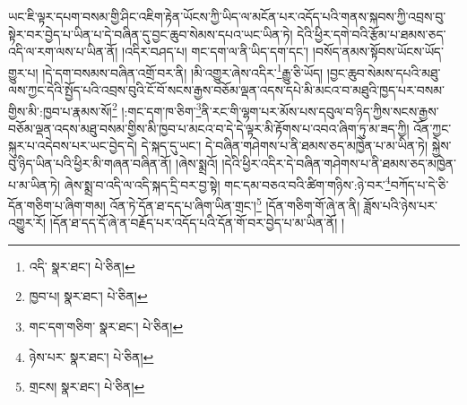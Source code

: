 ཡང་ཇི་ལྟར་དཔག་བསམ་གྱི་ཤིང་འཇིག་རྟེན་ཡོངས་ཀྱི་ཡིད་ལ་མངོན་པར་འདོད་པའི་གནས་སྐབས་ཀྱི་འབྲས་བུ་སྟེར་བར་བྱེད་པ་ཡིན་པ་དེ་བཞིན་དུ་བྱང་ཆུབ་སེམས་དཔའ་ཡང་ཡིན་ཏེ། དེའི་ཕྱིར་དགེ་བའི་རྩོམ་པ་ཐམས་ཅད་འདི་ལ་རག་ལས་པ་ཡིན་ནོ། །འདིར་བཤད་པ། གང་དག་ལ་ནི་ཡིད་དག་དང་། །བསོད་ནམས་སྟོབས་ཡོངས་ཡོད་གྱུར་པ། །དེ་དག་བསམས་བཞིན་འགྲོ་བར་ནི། །མི་འགྱུར་ཞེས་འདིར་\footnote{འདི་  སྣར་ཐང་།  པེ་ཅིན། }རྒྱུ་ཅི་ཡོད། །བྱང་ཆུབ་སེམས་དཔའི་མཐུ་ལས་ཀྱང་དེའི་སྤྱོད་པའི་འབྲས་བུའི་ངོ་བོ་སངས་རྒྱས་བཅོམ་ལྡན་འདས་དཔེ་མི་མངའ་བ་མཐུའི་ཁྱད་པར་བསམ་གྱིས་མི་:ཁྱབ་པ་རྣམས་སོ།\footnote{ཁྱབ་པ།  སྣར་ཐང་།  པེ་ཅིན། } །:གང་དག་ཁ་ཅིག་\footnote{གང་དག་གཅིག་  སྣར་ཐང་།  པེ་ཅིན། }ནི་རང་གི་ལྷག་པར་མོས་པས་དབུལ་བ་ཉིད་ཀྱིས་སངས་རྒྱས་བཅོམ་ལྡན་འདས་མཐུ་བསམ་གྱིས་མི་ཁྱབ་པ་མངའ་བ་དེ་དེ་ལྟར་མི་རྟོགས་པ་འབའ་ཞིག་ཏུ་མ་ཟད་ཀྱི། འོན་ཀྱང་སྐུར་པ་འདེབས་པར་ཡང་བྱེད་དེ། དེ་སྐད་དུ་ཡང་། དེ་བཞིན་གཤེགས་པ་ནི་ཐམས་ཅད་མཁྱེན་པ་མ་ཡིན་ཏེ། སྐྱེས་བུ་ཉིད་ཡིན་པའི་ཕྱིར་མི་གཞན་བཞིན་ནོ། །ཞེས་སྨྲའོ། །དེའི་ཕྱིར་འདིར་དེ་བཞིན་གཤེགས་པ་ནི་ཐམས་ཅད་མཁྱེན་པ་མ་ཡིན་ཏེ། ཞེས་སྨྲ་བ་འདི་ལ་འདི་སྐད་དྲི་བར་བྱ་སྟེ། གང་དམ་བཅའ་བའི་ཚིག་གཉིས་:ཉེ་བར་\footnote{ཉེས་པར་  སྣར་ཐང་།  པེ་ཅིན། }བཀོད་པ་དེ་ཅི་དོན་གཅིག་པ་ཞིག་གམ། འོན་ཏེ་དོན་ཐ་དད་པ་ཞིག་ཡིན་གྲང་།\footnote{གྲངས།  སྣར་ཐང་།  པེ་ཅིན། } །དོན་གཅིག་གོ་ཞེ་ན་ནི། ཟློས་པའི་ཉེས་པར་འགྱུར་རོ། །དོན་ཐ་དད་དོ་ཞེ་ན་བརྗོད་པར་འདོད་པའི་དོན་གོ་བར་བྱེད་པ་མ་ཡིན་ནོ། །
